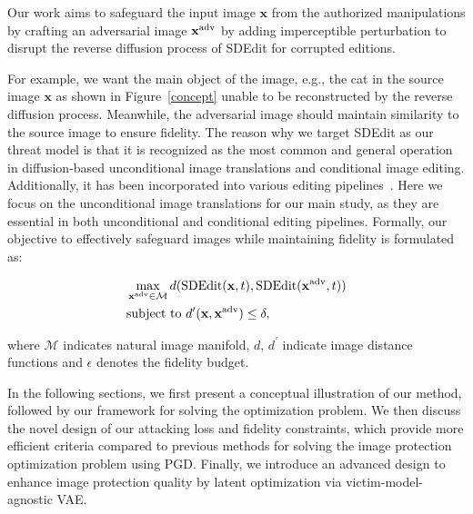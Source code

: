 Our work aims to safeguard the input image $\mathbf{x}$ from the authorized manipulations by crafting an adversarial image $\mathbf{x}^{\adv}$ by adding imperceptible perturbation to disrupt the reverse diffusion process of SDEdit for corrupted editions.

For example, we want the main object of the image, e.g., the cat in the source image $\mathbf{x}$ as shown in Figure~\ref{concept} unable to be reconstructed by the reverse diffusion process. Meanwhile, the adversarial image should maintain similarity to the source image to ensure fidelity. The reason why we target SDEdit as our threat model is that it is recognized as the most common and general operation in diffusion-based unconditional image translations and conditional image editing. Additionally, it has been incorporated into various editing pipelines~\cite{tsaban2023leditsrealimageediting, zhang2023inversion}. Here we focus on the unconditional image translations for our main study, as they are essential in both unconditional and conditional editing pipelines. Formally, our objective to effectively safeguard images while maintaining fidelity is formulated as:

\begin{equation}
    \begin{aligned}
        & \max_{\mathbf{x}^{\adv} \in \mathcal{M}} d(\text{SDEdit}(\mathbf{x}, t), \text{SDEdit}(\mathbf{x}^{\adv}, t)) \\
    & \text{subject to } d^{\prime}(\mathbf{x}, \mathbf{x}^{\adv}) \leq \delta,
    \end{aligned}
    \label{eq:probelm_setting_constraint}
\end{equation}

where $\mathcal{M}$ indicates natural image manifold, $d$, $d^{\prime}$ indicate image distance functions and $\epsilon$ denotes the fidelity budget.

In the following sections, we first present a conceptual illustration of our method, followed by our framework for solving the optimization problem. We then discuss the novel design of our attacking loss and fidelity constraints, which provide more efficient criteria compared to previous methods for solving the image protection optimization problem using PGD. Finally, we introduce an advanced design to enhance image protection quality by latent optimization via victim-model-agnostic VAE.

